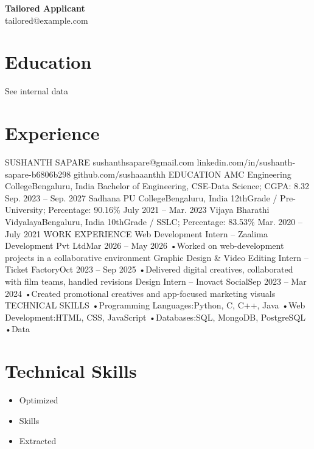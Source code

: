 \documentclass[11pt,a4paper]{article}
\begin{document}
\pagestyle{empty}

{\Huge \textcolor{primary}{\textbf{Tailored Applicant}}} \\
\vspace{1mm}
{\large tailored@example.com}
\vspace{4mm}

\section*{\textcolor{primary}{Education}}
\noindent See internal data

\section*{\textcolor{primary}{Experience}}

SUSHANTH SAPARE sushanthsapare@gmail.com linkedin.com/in/sushanth-sapare-b6806b298 github.com/sushaaanthh EDUCATION AMC Engineering CollegeBengaluru, India Bachelor of Engineering, CSE-Data Science; CGPA: 8.32 Sep. 2023 – Sep. 2027 Sadhana PU CollegeBengaluru, India 12thGrade / Pre-University; Percentage: 90.16\% July 2021 – Mar. 2023 Vijaya Bharathi VidyalayaBengaluru, India 10thGrade / SSLC; Percentage: 83.53\% Mar. 2020 – July 2021 WORK EXPERIENCE Web Development Intern – Zaalima Development Pvt LtdMar 2026 – May 2026 •Worked on web-development projects in a collaborative environment Graphic Design \& Video Editing Intern – Ticket FactoryOct 2023 – Sep 2025 •Delivered digital creatives, collaborated with film teams, handled revisions Design Intern – Inovact SocialSep 2023 – Mar 2024 •Created promotional creatives and app-focused marketing visuals TECHNICAL SKILLS •Programming Languages:Python, C, C++, Java •Web Development:HTML, CSS, JavaScript •Databases:SQL, MongoDB, PostgreSQL •Data

\section*{\textcolor{primary}{Technical Skills}}
\begin{itemize}
    \item Optimized
    \item Skills
    \item Extracted
\end{itemize}
\end{document}
